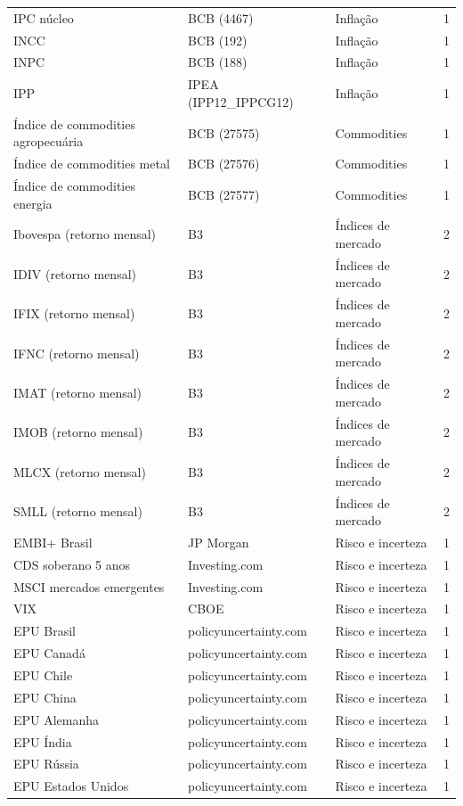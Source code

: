\documentclass[preprint,authoryear,review,12pt]{elsarticle}
\begin{document}
\begin{ThreePartTable}
\begin{longtable}{@{}p{5.2cm} l l c@{}}
IPC núcleo & BCB (4467) & Inflação & 1 \\
INCC & BCB (192) & Inflação & 1 \\
INPC & BCB (188) & Inflação & 1 \\
IPP & IPEA (IPP12\_IPPCG12) & Inflação & 1 \\
Índice de commodities agropecuária & BCB (27575) & Commodities & 1 \\
Índice de commodities metal & BCB (27576) & Commodities & 1 \\
Índice de commodities energia & BCB (27577) & Commodities & 1 \\
Ibovespa (retorno mensal) & B3 & Índices de mercado & 2 \\
IDIV (retorno mensal) & B3 & Índices de mercado & 2 \\
IFIX (retorno mensal) & B3 & Índices de mercado & 2 \\
IFNC (retorno mensal) & B3 & Índices de mercado & 2 \\
IMAT (retorno mensal) & B3 & Índices de mercado & 2 \\
IMOB (retorno mensal) & B3 & Índices de mercado & 2 \\
MLCX (retorno mensal) & B3 & Índices de mercado & 2 \\
SMLL (retorno mensal) & B3 & Índices de mercado & 2 \\
EMBI+ Brasil & JP Morgan & Risco e incerteza & 1 \\
CDS soberano 5 anos & Investing.com & Risco e incerteza & 1 \\
MSCI mercados emergentes & Investing.com & Risco e incerteza & 1 \\
VIX & CBOE & Risco e incerteza & 1 \\
EPU Brasil & policyuncertainty.com & Risco e incerteza & 1 \\
EPU Canadá & policyuncertainty.com & Risco e incerteza & 1 \\
EPU Chile & policyuncertainty.com & Risco e incerteza & 1 \\
EPU China & policyuncertainty.com & Risco e incerteza & 1 \\
EPU Alemanha & policyuncertainty.com & Risco e incerteza & 1 \\
EPU Índia & policyuncertainty.com & Risco e incerteza & 1 \\
EPU Rússia & policyuncertainty.com & Risco e incerteza & 1 \\
EPU Estados Unidos & policyuncertainty.com & Risco e incerteza & 1 \\

\end{longtable}
\end{ThreePartTable}
\end{document}
